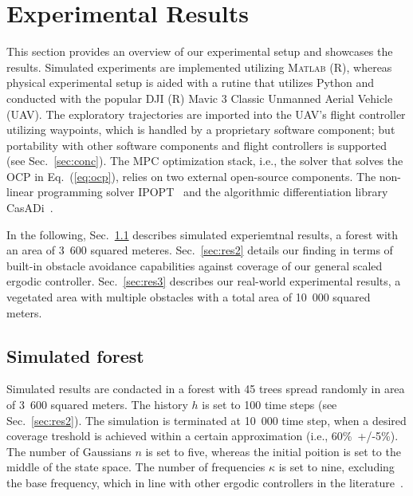 \documentclass[letterpaper,10pt,conference,twoside]{IEEEtran}
\theoremstyle{definition}
\begin{document}
\section{Experimental Results}\label{sec:res}
\noindent
This section provides an overview of our experimental setup and showcases the results. Simulated experiments are implemented utilizing \textsc{Matlab} (R), whereas physical experimental setup is aided with a rutine that utilizes Python and conducted with the popular DJI (R) Mavic 3 Classic Unmanned Aerial Vehicle (UAV). The exploratory trajectories are imported into the UAV's flight controller utilizing waypoints, which is handled by a proprietary software component; but portability with other software components and flight controllers is supported (see Sec.~\ref{sec:conc}). 
The MPC optimization stack, i.e., the solver that solves the OCP in Eq.~(\ref{eq:ocp}), relies on two external open-source components. The non-linear programming solver IPOPT~\cite{wachter2006implementation} and the algorithmic differentiation library CasADi~\cite{andersson2012casadi}.

In the following, Sec.~\ref{sec:res1} describes simulated experiemtnal results, a forest with an area of 3~600 squared meteres. Sec.~\ref{sec:res2} details our finding in terms of built-in obstacle avoidance capabilities against coverage of our general scaled ergodic controller. Sec.~\ref{sec:res3} describes our real-world experimental results, a vegetated area with multiple obstacles with a total area of 10~000 squared meters.

\subsection{Simulated forest}\label{sec:res1}
\noindent
Simulated results are condacted in a forest with 45 trees spread randomly in area of 3~600 squared meters. The history $h$ is set to 100 time steps (see Sec.~\ref{sec:res2}). The simulation is terminated at 10~000 time step, when a desired coverage treshold is achieved within a certain approximation (i.e., 60\%~+/-5\%). The number of Gaussians $n$ is set to five, whereas the initial poition is set to the middle of the state space. The number of frequencies $\kappa$ is set to nine, excluding the base frequency, which in line with other ergodic controllers in the literature~\cite{seewald2022energy}. 
\end{document}
